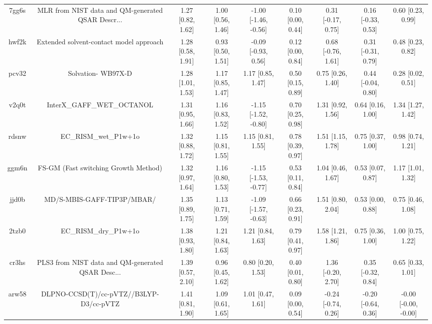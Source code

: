 \documentclass{article}
\begin{document}
\begin{center}
\begin{longtable}{|ccccccccc|}
 7gg6s &  MLR from NIST data and QM-generated QSAR Descr... &  1.27 [0.82, 1.62] &  1.00 [0.56, 1.46] &  -1.00 [-1.46, -0.56] &  0.10 [0.00, 0.44] &   0.31 [-0.17, 0.75] &   0.16 [-0.33, 0.53] &     0.60 [0.23, 0.99] \\
 hwf2k &            Extended solvent-contact model approach &  1.28 [0.58, 1.91] &  0.93 [0.50, 1.51] &   -0.09 [-0.93, 0.56] &  0.12 [0.00, 0.84] &   0.68 [-0.76, 1.61] &   0.31 [-0.31, 0.79] &     0.48 [0.23, 0.82] \\
 pcv32 &                                 Solvation- WB97X-D &  1.28 [1.01, 1.53] &  1.17 [0.85, 1.47] &     1.17 [0.85, 1.47] &  0.50 [0.15, 0.89] &    0.75 [0.26, 1.40] &   0.44 [-0.04, 0.80] &     0.28 [0.02, 0.51] \\
 v2q0t &                         InterX\_GAFF\_WET\_OCTANOL &  1.31 [0.95, 1.66] &  1.16 [0.83, 1.52] &  -1.15 [-1.52, -0.80] &  0.70 [0.25, 0.98] &    1.31 [0.92, 1.56] &    0.64 [0.16, 1.00] &     1.34 [1.27, 1.42] \\
 rdsnw &                              EC\_RISM\_wet\_P1w+1o &  1.32 [0.88, 1.72] &  1.15 [0.81, 1.55] &     1.15 [0.81, 1.55] &  0.78 [0.39, 0.97] &    1.51 [1.15, 1.78] &    0.75 [0.37, 1.00] &     0.98 [0.74, 1.21] \\
 ggm6n &               FS-GM (Fast switching Growth Method) &  1.32 [0.97, 1.64] &  1.16 [0.80, 1.53] &  -1.15 [-1.53, -0.77] &  0.53 [0.11, 0.84] &    1.04 [0.46, 1.67] &    0.53 [0.07, 0.87] &     1.17 [1.01, 1.32] \\
 jjd0b &                         MD/S-MBIS-GAFF-TIP3P/MBAR/ &  1.35 [0.89, 1.75] &  1.13 [0.71, 1.59] &  -1.09 [-1.57, -0.63] &  0.66 [0.23, 0.91] &    1.51 [0.80, 2.04] &    0.53 [0.00, 0.88] &     0.75 [0.46, 1.08] \\
 2tzb0 &                              EC\_RISM\_dry\_P1w+1o &  1.38 [0.93, 1.80] &  1.21 [0.84, 1.63] &     1.21 [0.84, 1.63] &  0.79 [0.41, 0.97] &    1.58 [1.21, 1.86] &    0.75 [0.36, 1.00] &     1.00 [0.75, 1.22] \\
 cr3hs &  PLS3 from NIST data and QM-generated QSAR Desc... &  1.39 [0.57, 2.10] &  0.96 [0.45, 1.62] &     0.80 [0.20, 1.53] &  0.40 [0.01, 0.80] &   1.36 [-0.20, 2.70] &   0.35 [-0.32, 0.84] &     0.65 [0.33, 1.01] \\
 arw58 &            DLPNO-CCSD(T)/cc-pVTZ//B3LYP-D3/cc-pVTZ &  1.41 [0.81, 1.90] &  1.09 [0.61, 1.65] &     1.01 [0.47, 1.61] &  0.09 [0.00, 0.54] &  -0.24 [-0.74, 0.26] &  -0.20 [-0.64, 0.36] &  -0.00 [-0.00, -0.00] \\

\end{longtable}
\end{center}
\end{document}
